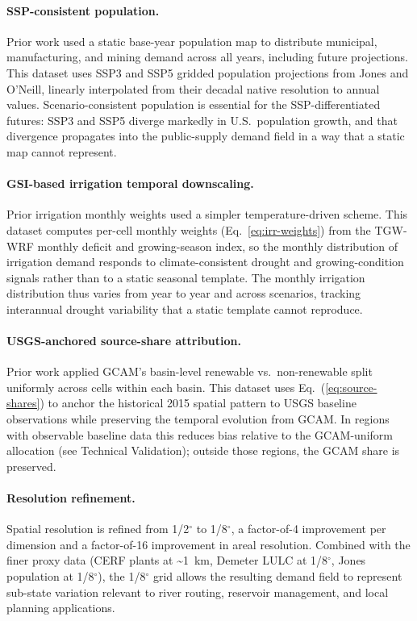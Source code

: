 \documentclass[fleqn,10pt]{wlscirep}
\begin{document}
\paragraph{SSP-consistent population.} Prior work used a static base-year population map to distribute municipal, manufacturing, and mining demand across all years, including future projections. This dataset uses SSP3 and SSP5 gridded population projections from Jones and O'Neill\cite{Jones_2016}, linearly interpolated from their decadal native resolution to annual values. Scenario-consistent population is essential for the SSP-differentiated futures: SSP3 and SSP5 diverge markedly in U.S.~population growth, and that divergence propagates into the public-supply demand field in a way that a static map cannot represent.

\paragraph{GSI-based irrigation temporal downscaling.} Prior irrigation monthly weights used a simpler temperature-driven scheme. This dataset computes per-cell monthly weights (Eq.~\ref{eq:irr-weights}) from the TGW-WRF monthly deficit and growing-season index, so the monthly distribution of irrigation demand responds to climate-consistent drought and growing-condition signals rather than to a static seasonal template. The monthly irrigation distribution thus varies from year to year and across scenarios, tracking interannual drought variability that a static template cannot reproduce.

\paragraph{USGS-anchored source-share attribution.} Prior work applied GCAM's basin-level renewable vs.\ non-renewable split uniformly across cells within each basin. This dataset uses Eq.~(\ref{eq:source-shares}) to anchor the historical 2015 spatial pattern to USGS baseline observations while preserving the temporal evolution from GCAM. In regions with observable baseline data this reduces bias relative to the GCAM-uniform allocation (see Technical Validation); outside those regions, the GCAM share is preserved.

\paragraph{Resolution refinement.} Spatial resolution is refined from 1/2$^{\circ}$ to 1/8$^{\circ}$, a factor-of-4 improvement per dimension and a factor-of-16 improvement in areal resolution. Combined with the finer proxy data (CERF plants at \textasciitilde1~km, Demeter LULC at 1/8$^{\circ}$, Jones population at 1/8$^{\circ}$), the 1/8$^{\circ}$ grid allows the resulting demand field to represent sub-state variation relevant to river routing, reservoir management, and local planning applications.
\end{document}
